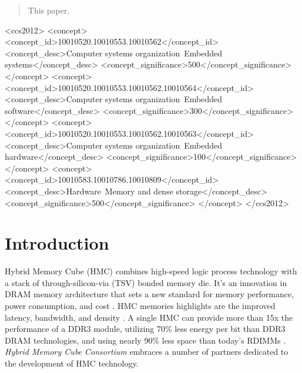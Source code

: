 \documentclass{sig-alternate-05-2015}
\begin{document}
\begin{abstract}
This paper.
\end{abstract}


%
%
\begin{CCSXML}
<ccs2012>
<concept>
<concept_id>10010520.10010553.10010562</concept_id>
<concept_desc>Computer systems organization~Embedded systems</concept_desc>
<concept_significance>500</concept_significance>
</concept>
<concept>
<concept_id>10010520.10010553.10010562.10010564</concept_id>
<concept_desc>Computer systems organization~Embedded software</concept_desc>
<concept_significance>300</concept_significance>
</concept>
<concept>
<concept_id>10010520.10010553.10010562.10010563</concept_id>
<concept_desc>Computer systems organization~Embedded hardware</concept_desc>
<concept_significance>100</concept_significance>
</concept>
<concept>
<concept_id>10010583.10010786.10010809</concept_id>
<concept_desc>Hardware~Memory and dense storage</concept_desc>
<concept_significance>500</concept_significance>
</concept>
</ccs2012>
\end{CCSXML}



%
%

%
%
\printccsdesc



\section{Introduction} \label{sec:Introduction}

Hybrid Memory Cube (HMC) combines high-speed logic process technology with a stack of through-silicon-via (TSV) bonded memory die. It's an innovation in DRAM memory architecture that sets a new standard for memory performance, power consumption, and cost \cite{hmc_Consortium}. HMC memories highlights are the improved latency, bandwidth, and density \cite{jeddeloh2012HMC}. A single HMC can provide more than 15x the performance of a DDR3 module, utilizing 70\% less energy per bit than DDR3 DRAM technologies, and using nearly 90\% less space than today's RDIMMs \cite{hmc_Consortium}. \emph{Hybrid Memory Cube Consortium} \cite{hmc_Consortium} embraces a number of partners dedicated to the development of HMC technology.
\end{document}
